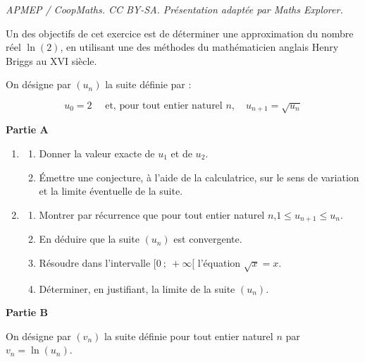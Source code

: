 \documentclass[10pt]{article}
\begin{document}
\noindent\textit{APMEP / CoopMaths. CC BY-SA. Présentation adaptée par Maths Explorer.}\par\medskip
\medskip

Un des objectifs de cet exercice est de déterminer une approximation du nombre réel $\ln(2)$, en utilisant une des méthodes du mathématicien anglais Henry Briggs au XVI siècle.

\bigskip

On désigne par $\left(u_{n}\right)$ la suite définie par :

\[u_{0}=2 \quad \text { et, pour tout entier naturel } n,\quad  u_{n+1}=\sqrt{u_{n}}\]

\medskip

\textbf{Partie A}

\medskip

\begin{enumerate}
\item 
	\begin{enumerate}
		\item Donner la valeur exacte de $u_{1}$ et de $u_{2}$.
		\item Émettre une conjecture, à l'aide de la calculatrice, sur le sens de variation et la limite éventuelle de la suite.
	\end{enumerate}
\item 
	\begin{enumerate}
		\item Montrer par récurrence que pour tout entier naturel $n$,\quad $1 \leqslant u_{n+1} \leqslant u_{n}$.
		\item En déduire que la suite $\left(u_{n}\right)$ est convergente.
		\item Résoudre dans l'intervalle $[0~;~+\infty[$ l'équation $\sqrt{x} =x$.
		\item Déterminer, en justifiant, la limite de la suite $\left(u_{n}\right)$.
	\end{enumerate}
\end{enumerate}

\medskip

\textbf{Partie B}

\medskip
	On désigne par $\left(v_{n}\right)$ la suite définie pour tout entier naturel $n$ par $v_{n}=\ln \left(u_{n}\right)$.

\medskip
\end{document}
